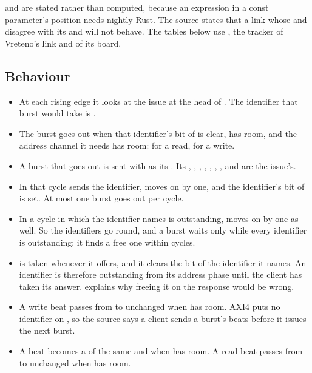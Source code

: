  and  are stated rather than computed, because an
expression in a const parameter's position needs nightly Rust. The
source states that a link whose  and  disagree with
its  and  will not behave. The tables below use
, the tracker of Vreteno's link and of
its board.


\subsection*{Behaviour}

\begin{itemize}
\item At each rising edge it looks at the issue at the head of
. The identifier that burst would take is .
\item The burst goes out when that identifier's bit of  is
clear,  has room, and the address channel it needs has
room:  for a read,  for a write.
\item A burst that goes out is sent with  as its .
Its , , , , ,
, ,  and  are the
issue's.
\item In that cycle  sends the identifier, 
moves on by one, and the identifier's bit of  is set. At
most one burst goes out per cycle.
\item In a cycle in which the identifier  names is
outstanding,  moves on by one as well. So the identifiers
go round, and a burst waits only while every identifier is
outstanding; it finds a free one within  cycles.
\item {} is taken whenever it offers, and it clears the
bit of the identifier it names. An identifier is therefore outstanding
from its address phase until the client has taken its answer.
 explains why freeing it on the response would be
wrong.
\item A write beat passes from  to  unchanged when
 has room. AXI4 puts no identifier on , so the source
says a client sends a burst's beats before it issues the next burst.
\item A  beat becomes a  of the same  and
 when  has room. A read beat passes from
 to  unchanged when  has room.
\end{itemize}

